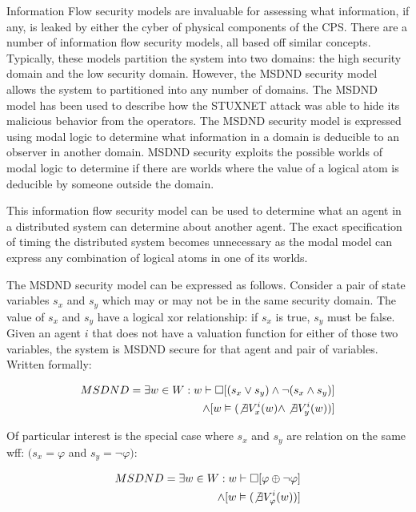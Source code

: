 Information Flow security models are invaluable for assessing what information, if any, is leaked by either the cyber of physical components of the CPS. There are a number of information flow security models, all based off similar concepts. Typically, these models partition the system into two domains: the high security domain and the low security domain. However, the MSDND security model allows the system to partitioned into any number of domains. The MSDND model has been used to describe how the STUXNET attack was able to hide its malicious behavior from the operators. The MSDND security model is expressed using modal logic to determine what information in a domain is deducible to an observer in another domain. MSDND security exploits the possible worlds of modal logic to determine if there are worlds where the value of a logical atom is deducible by someone outside the domain.

This information flow security model can be used to determine what an agent in a distributed system can determine about another agent. The exact specification of timing the distributed system becomes unnecessary as the modal model can express any combination of logical atoms in one of its worlds. 

The MSDND security model can be expressed as follows. Consider a pair of state variables $s_x$ and $s_y$ which may or may not be in the same security domain. The value of $s_x$ and $s_y$ have a logical xor relationship: if $s_x$ is true, $s_y$ must be false. Given an agent $i$ that does not have a valuation function for either of those two variables, the system is MSDND secure for that agent and pair of variables. Written formally:

\begin{align}
MSDND = \exists w \in W : w \vdash \Box [ (s_x \vee s_y) \wedge \neg(s_x \wedge s_y) ] 
\nonumber \\ \wedge [ w \vDash ( \not \exists V_x^i (w) \wedge \not \exists V_y^i (w) ) ]
\end{align}

Of particular interest is the special case where $s_x$ and $s_y$ are relation on the same wff: $(s_x = \varphi$ and $s_y = \neg \varphi)$:

\begin{align}
MSDND = \exists w \in W : w \vdash \Box [ \varphi \oplus \neg \varphi ] 
\nonumber \\ \wedge [ w \vDash ( \not \exists V_\varphi^i(w)) ]
\end{align}

